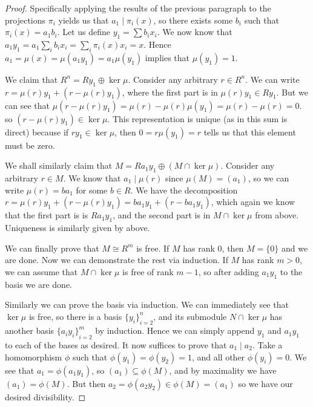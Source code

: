 \begin{proof}
    Specifically applying the results of the previous paragraph to the projections \(\pi_i\)
    yields us that \(a_1 \mid \pi_i(x)\),
    so there exists some \(b_i\) such that \(\pi_i(x) = a_1b_i\).
    Let us define \(y_1 = \sum b_i x_i\).
    We now know that \(a_1y_1 = a_1 \sum_i b_i x_i = \sum_i \pi_i(x) x_i = x\).
    Hence \(a_1 = \mu(x) = \mu(a_1 y_1) = a_1 \mu(y_1)\) implies that \(\mu(y_1) = 1\).

    We claim that \(R^n = Ry_1 \oplus \ker\mu\).
    Consider any arbitrary \(r \in R^n\).
    We can write \(r = \mu(r)y_1 + (r - \mu(r)y_1)\),
    where the first part is in \(\mu(r)y_1 \in Ry_1\).
    But we can see that \(\mu(r-\mu(r)y_1) = \mu(r) - \mu(r)\mu(y_1) = \mu(r) - \mu(r) = 0\).
    so \((r - \mu(r)y_1) \in \ker\mu\).
    This representation is unique (as in this sum is direct)
    because if \(ry_1 \in \ker\mu\),
    then \(0 = r\mu(y_1) = r\) tells us that this element must be zero.
    
    We shall similarly claim that \(M = Ra_1y_1 \oplus (M \cap \ker\mu)\).
    Consider any arbitrary \(r \in M\).
    We know that \(a_1 \mid \mu(r)\) since \(\mu(M) = (a_1)\),
    so we can write \(\mu(r) = ba_1\) for some \(b \in R\).
    We have the decomposition \(r = \mu(r)y_1 + (r - \mu(r)y_1) = ba_1y_1 + (r-ba_1y_1)\),
    which again we know that the first part is is \(Ra_1y_1\),
    and the second part is in \(M \cap \ker\mu\) from above.
    Uniqueness is similarly given by above.

    We can finally prove that \(M \cong R^m\) is free.
    If \(M\) has rank 0, then \(M = \{0\}\) and we are done.
    Now we can demonstrate the rest via induction.
    If \(M\) has rank \(m > 0\),
    we can assume that \(M \cap \ker\mu\) is free of rank \(m-1\),
    so after adding \(a_1y_1\) to the basis we are done.

    Similarly we can prove the basis via induction.
    We can immediately see that \(\ker\mu\) is free,
    so there is a basis \({\{y_i\}}_{i=2}^n\),
    and its submodule \(N \cap \ker\mu\) has another basis \({\{a_i y_i\}}_{i=2}^m\) by induction.
    Hence we can simply append \(y_1\) and \(a_1 y_1\) to each of the bases as desired.
    It now suffices to prove that \(a_1 \mid a_2\).
    Take a homomorphism \(\phi\) such that \(\phi(y_1) = \phi(y_2) = 1\),
    and all other \(\phi(y_i) = 0\).
    We see that \(a_1 = \phi(a_1 y_1)\), so \((a_1) \subseteq \phi(M)\),
    and by maximality we have \((a_1) = \phi(M)\).
    But then \(a_2 = \phi(a_2 y_2) \in \phi(M) = (a_1)\)
    so we have our desired divisibility.
\end{proof}

